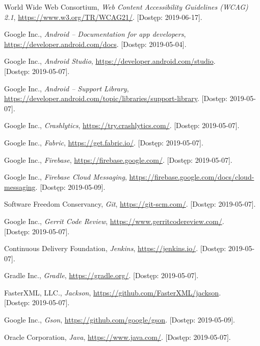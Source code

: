 \documentclass{pracamgr}
\begin{document}
\begin{thebibliography}{99}
 World Wide Web Consortium, \textit{Web Content Accessibility Guidelines (WCAG) 2.1},
\url{https://www.w3.org/TR/WCAG21/}. [Dostęp: 2019-06-17].

 Google Inc., \textit{Android -- Documentation for app developers},
	 \url{https://developer.android.com/docs}. [Dostęp: 2019-05-04].

 Google Inc., \textit{Android Studio},
	\url{https://developer.android.com/studio}. \\ 
	{[Dostęp: 2019-05-07]}.

 Google Inc., \textit{Android -- Support Library},
	\url{https://developer.android.com/topic/libraries/support-library}. [Dostęp: 2019-05-07].

 Google Inc., \textit{Crashlytics}, \url{https://try.crashlytics.com/}. [Dostęp: 2019-05-07].

 Google Inc., \textit{Fabric}, \url{https://get.fabric.io/}. [Dostęp: 2019-05-07].

 Google Inc., \textit{Firebase}, \url{https://firebase.google.com/}. [Dostęp: 2019-05-07].

 Google Inc., \textit{Firebase Cloud Messaging},
	\url{https://firebase.google.com/docs/cloud-messaging}. [Dostęp: 2019-05-09].

 Software Freedom Conservancy, \textit{Git},
	\url{https://git-scm.com/}. [Dostęp: 2019-05-07].

 Google Inc., \textit{Gerrit Code Review},
	\url{https://www.gerritcodereview.com/}.\\
	{[Dostęp: 2019-05-07]}.

 Continuous Delivery Foundation, \textit{Jenkins},
	\url{https://jenkins.io/}. [Dostęp: 2019-05-07].

 Gradle Inc., \textit{Gradle}, \url{https://gradle.org/}. [Dostęp: 2019-05-07].

 FasterXML, LLC., \textit{Jackson},
	\url{https://github.com/FasterXML/jackson}.\\
	{[Dostęp: 2019-05-07]}.

 Google Inc., \textit{Gson},	\url{https://github.com/google/gson}. [Dostęp: 2019-05-09].

 Oracle Corporation, \textit{Java}, \url{https://www.java.com/}. [Dostęp: 2019-05-07].


\end{thebibliography}
\end{document}
